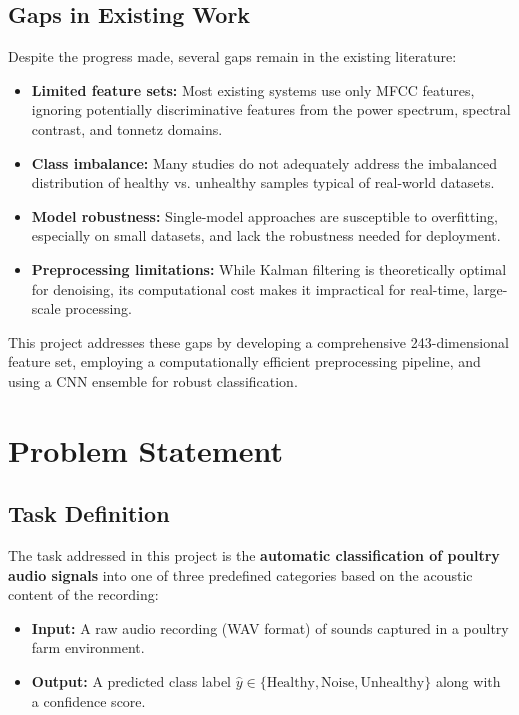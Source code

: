 \documentclass[12pt,a4paper]{report}
\begin{document}
\section{Gaps in Existing Work}

Despite the progress made, several gaps remain in the existing literature:
\begin{itemize}
    \item \textbf{Limited feature sets:} Most existing systems use only MFCC features, ignoring potentially discriminative features from the power spectrum, spectral contrast, and tonnetz domains.
    \item \textbf{Class imbalance:} Many studies do not adequately address the imbalanced distribution of healthy vs. unhealthy samples typical of real-world datasets.
    \item \textbf{Model robustness:} Single-model approaches are susceptible to overfitting, especially on small datasets, and lack the robustness needed for deployment.
    \item \textbf{Preprocessing limitations:} While Kalman filtering is theoretically optimal for denoising, its computational cost makes it impractical for real-time, large-scale processing.
\end{itemize}

This project addresses these gaps by developing a comprehensive 243-dimensional feature set, employing a computationally efficient preprocessing pipeline, and using a CNN ensemble for robust classification.


\chapter{Problem Statement}
\label{ch:problem_statement}

\section{Task Definition}

The task addressed in this project is the \textbf{automatic classification of poultry audio signals} into one of three predefined categories based on the acoustic content of the recording:

\begin{itemize}
    \item \textbf{Input:} A raw audio recording (WAV format) of sounds captured in a poultry farm environment.
    \item \textbf{Output:} A predicted class label $\hat{y} \in \{\text{Healthy}, \text{Noise}, \text{Unhealthy}\}$ along with a confidence score.
\end{itemize}
\end{document}
